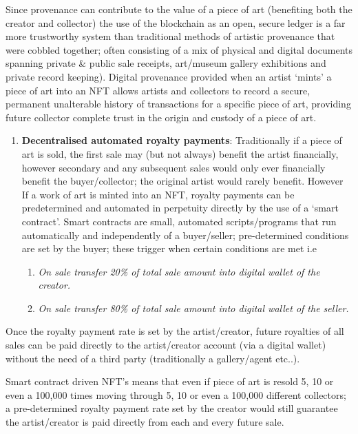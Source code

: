 Since provenance can contribute to the value of a piece of art
(benefiting both the creator and collector) the use of the blockchain as
an open, secure ledger is a far more trustworthy system than traditional
methods of artistic provenance that were cobbled together; often
consisting of a mix of physical and digital documents spanning private
\& public sale receipts, art/museum gallery exhibitions and private
record keeping). Digital provenance provided when an artist `mints' a
piece of art into an NFT allows artists and collectors to record a
secure, permanent unalterable history of transactions for a specific
piece of art, providing future collector complete trust in the origin
and custody of a piece of art.

\begin{enumerate}
\def\labelenumi{\alph{enumi}.}
\setcounter{enumi}{1}
\item
  \textbf{Decentralised automated royalty payments}: Traditionally if a
  piece of art is sold, the first sale may (but not always) benefit the
  artist financially, however secondary and any subsequent sales would
  only ever financially benefit the buyer/collector; the original artist
  would rarely benefit. However If a work of art is minted into an NFT,
  royalty payments can be predetermined and automated in perpetuity
  directly by the use of a `smart contract'. Smart contracts are small,
  automated scripts/programs that run automatically and independently of
  a buyer/seller; pre-determined conditions are set by the buyer; these
  trigger when certain conditions are met i.e

  \begin{enumerate}
  \def\labelenumii{\roman{enumii}.}
  \item
    \emph{On sale transfer 20\% of total sale amount into digital wallet
    of the creator.}
  \item
    \emph{On sale transfer 80\% of total sale amount into digital wallet
    of the seller.}
  \end{enumerate}
\end{enumerate}

Once the royalty payment rate is set by the artist/creator, future
royalties of all sales can be paid directly to the artist/creator
account (via a digital wallet) without the need of a third party
(traditionally a gallery/agent etc..).

Smart contract driven NFT's means that even if piece of art is resold 5,
10 or even a 100,000 times moving through 5, 10 or even a 100,000
different collectors; a pre-determined royalty payment rate set by the
creator would still guarantee the artist/creator is paid directly from
each and every future sale.

